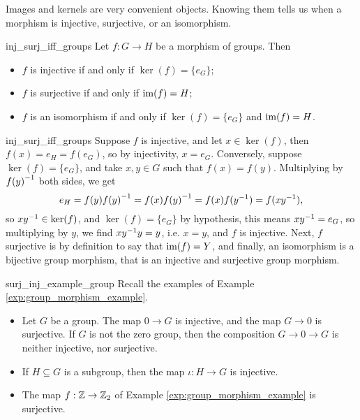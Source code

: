 Images and kernels are very convenient objects. Knowing them tells us when a morphism is injective, surjective, or an isomorphism.
\begin{cprop}{}{inj_surj_iff_groups}
    Let \( f : G \to H \) be a morphism of groups. Then
    \begin{itemize}
        \item \( f \) is injective if and only if \( \ker(f) = \{ e_G \} \);
        \item \( f \) is surjective if and only if \( \operatorname{im}(f) = H \);
        \item \( f \) is an isomorphism if and only if \( \ker(f) = \{ e_G \} \) and \( \operatorname{im}(f) = H \).
    \end{itemize}
\end{cprop}
\begin{propproof}{inj_surj_iff_groups}
    Suppose \( f \) is injective, and let \( x \in \ker(f) \), then \( f(x) = e_H = f(e_G )\), so by injectivity, \( x = e_G \). Conversely, suppose \( \ker(f) = \{ e_G \} \), and take \( x, y \in G \) such that \( f(x) = f(y) \). Multiplying by \( {f(y)}^{-1} \) both sides, we get
    \begin{equation*}
        e_H = f(y) {f(y)}^{-1} = f(x) {f(y)}^{-1} = f(x)f({y}^{-1}) = f(x{y}^{-1}),
    \end{equation*}
    so \( x {y}^{-1} \in \ker(f) \), and \( \ker(f) = \{ e_G \} \) by hypothesis, this means \( x {y}^{-1} = e_G \), so multiplying by \( y \), we find \( x {y}^{-1} y = y \), i.e. \( x = y \), and \( f \) is injective. Next, \( f \) surjective is by definition to say that \( \operatorname{im}(f) = Y \), and finally, an isomorphism is a bijective group morphism, that is an injective and surjective group morphism.
\end{propproof}

\begin{cexp}{}{surj_inj_example_group}
    Recall the examples of Example \ref{exp:group_morphism_example}.
    \begin{itemize}
        \item Let \( G \) be a group. The map \( 0 \to G \) is injective, and the map \( G \to 0 \) is surjective. If \( G \) is not the zero group, then the composition \( G \to 0 \to G \) is neither injective, nor surjective.
        \item If \( H \subseteq G \) is a subgroup, then the map \( \iota : H \to G \) is injective.
        \item The map \( f : \mathbb{Z} \to \mathbb{Z}_2 \) of Example \ref{exp:group_morphism_example} is surjective. 
    \end{itemize}
\end{cexp}


